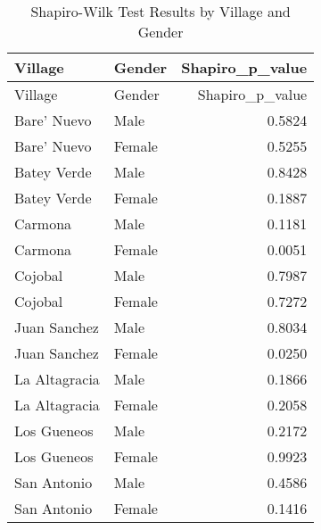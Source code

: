 \documentclass[
]{article}
\begin{document}
\begin{longtable}[]{@{}llr@{}}
\caption{Shapiro-Wilk Test Results by Village and Gender}\tabularnewline
\toprule\noalign{}
Village & Gender & Shapiro\_p\_value \\
\midrule\noalign{}
\endfirsthead
\toprule\noalign{}
Village & Gender & Shapiro\_p\_value \\
\midrule\noalign{}
\endhead
\bottomrule\noalign{}
\endlastfoot
Bare' Nuevo & Male & 0.5824 \\
Bare' Nuevo & Female & 0.5255 \\
Batey Verde & Male & 0.8428 \\
Batey Verde & Female & 0.1887 \\
Carmona & Male & 0.1181 \\
Carmona & Female & 0.0051 \\
Cojobal & Male & 0.7987 \\
Cojobal & Female & 0.7272 \\
Juan Sanchez & Male & 0.8034 \\
Juan Sanchez & Female & 0.0250 \\
La Altagracia & Male & 0.1866 \\
La Altagracia & Female & 0.2058 \\
Los Gueneos & Male & 0.2172 \\
Los Gueneos & Female & 0.9923 \\
San Antonio & Male & 0.4586 \\
San Antonio & Female & 0.1416 \\
\end{longtable}
\end{document}
